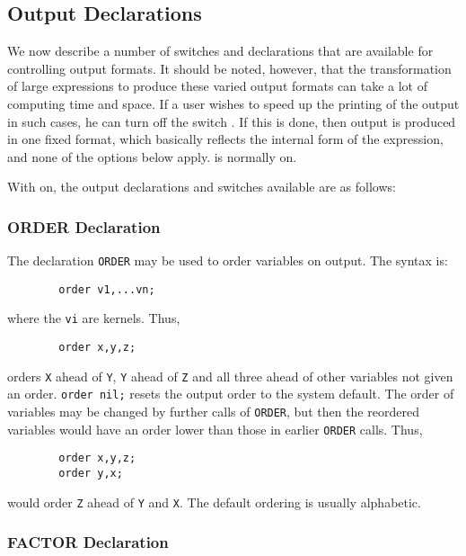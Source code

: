 \subsection{Output Declarations}
\hypertarget{switch:PRI}{}

We now describe a number of switches and declarations that are available
for controlling output formats. It should be noted, however, that the
transformation of large expressions to produce these varied output formats
can take a lot of computing time and space. If a user wishes to speed up
the printing of the output in such cases, he can turn off the switch
. If this is done, then output is produced in one fixed
format, which basically reflects the internal form of the expression, and
none of the options below apply.  is normally on.

With  on, the output declarations
and switches available are as follows:

\subsubsection{ORDER Declaration}
\hypertarget{command:ORDER}{}

The declaration \texttt{ORDER} may be used to order variables
on output.  The syntax is:
\begin{verbatim}
        order v1,...vn;
\end{verbatim}
where the \texttt{vi} are kernels.  Thus,
\begin{verbatim}
        order x,y,z;
\end{verbatim}
orders \texttt{X} ahead of \texttt{Y}, \texttt{Y} ahead of \texttt{Z} and all three
ahead of other variables not given an order. \texttt{order nil;} resets the
output order to the system default.  The order of variables may be changed
by further calls of \texttt{ORDER}, but then the reordered variables would
have an order lower than those in earlier \texttt{ORDER} calls.
Thus,
\begin{verbatim}
        order x,y,z;
        order y,x;
\end{verbatim}
would order \texttt{Z} ahead of \texttt{Y} and \texttt{X}.  The default ordering is
usually alphabetic.

\subsubsection{FACTOR Declaration}
\hypertarget{command:FACTOR}{}

